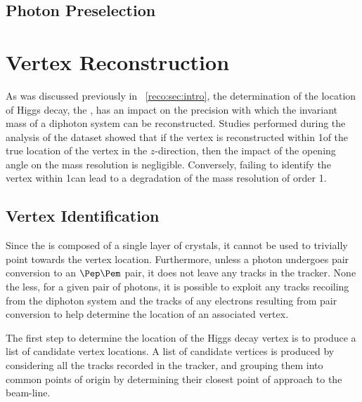 \subsection{Photon Preselection}

\section{Vertex Reconstruction}
\label{reco:sec:vertex}

As was discussed previously in \Sec~\ref{reco:sec:intro}, the determination of the location of Higgs decay, the \PV, has an impact on the precision with which the invariant mass of a diphoton system can be reconstructed. Studies performed during the analysis of the \RunI dataset showed that if the vertex is reconstructed within 1\cm of the true location of the vertex in the $z$-direction, then the impact of the opening angle on the mass resolution is negligible. Conversely, failing to identify the vertex within 1\cm can lead to a degradation of the mass resolution of order 1\GeV.


\subsection{Vertex Identification}
Since the \CMS \ECAL is composed of a single layer of crystals, it cannot be used to trivially point towards the vertex location. Furthermore, unless a photon undergoes pair conversion to an $\Pep \Pem$ pair, it does not leave any tracks in the tracker. 
None the less, for a given pair of photons, it is possible to exploit any tracks recoiling from the diphoton system  and the tracks of any electrons resulting from pair conversion to help determine the location of an associated vertex.

The first step to determine the location of the Higgs decay vertex is to produce a list of candidate vertex locations. A list of candidate vertices is produced by considering all the tracks recorded in the tracker, and grouping them into common points of origin by determining their closest point of approach to the beam-line.

